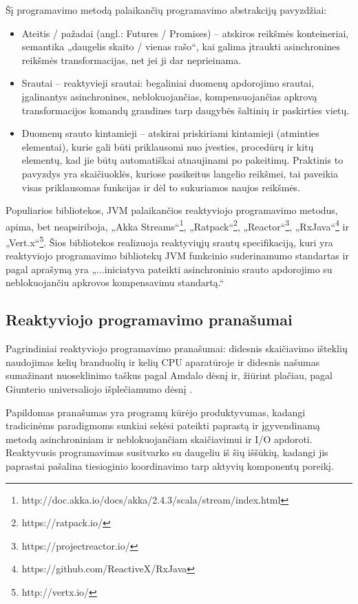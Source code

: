 Šį programavimo metodą palaikančių programavimo abstrakcijų pavyzdžiai:

\begin{itemize}
  \item Ateitis / pažadai (angl.: Futures / Promises) – atskiros reikšmės konteineriai, semantika „daugelis skaito / vienas rašo“, kai galima įtraukti asinchronines reikšmės transformacijas, net jei ji dar neprieinama.
  \item Srautai – reaktyvieji srautai: begaliniai duomenų apdorojimo srautai, įgalinantys asinchronines, neblokuojančias, kompensuojančias apkrovą transformacijos komandų grandines tarp daugybės šaltinių ir paskirties vietų.
  \item Duomenų srauto kintamieji – atskirai priskiriami kintamieji (atminties elementai), kurie gali būti priklausomi nuo įvesties, procedūrų ir kitų elementų, kad jie būtų automatiškai atnaujinami po pakeitimų. Praktinis to pavyzdys yra skaičiuoklės, kuriose pasikeitus langelio reikšmei, tai paveikia visas priklausomas funkcijas ir dėl to sukuriamos naujos reikšmės.
\end{itemize}

Populiarios bibliotekos, JVM palaikančios reaktyviojo programavimo metodus, apima, bet neapsiriboja, „Akka Streams“\footnote{http://doc.akka.io/docs/akka/2.4.3/scala/stream/index.html}, „Ratpack“\footnote{https://ratpack.io/}, „Reactor“\footnote{https://projectreactor.io/}, „RxJava“\footnote{https://github.com/ReactiveX/RxJava} ir „Vert.x“\footnote{http://vertx.io/}. Šios bibliotekos realizuoja reaktyviųjų srautų specifikaciją, kuri yra reaktyviojo programavimo bibliotekų JVM funkcinio suderinamumo standartas ir pagal aprašymą yra „...iniciatyva pateikti asinchroninio srauto apdorojimo su neblokuojančiu apkrovos kompensavimu standartą.“

\subsection{Reaktyviojo programavimo pranašumai}

Pagrindiniai reaktyviojo programavimo pranašumai: didesnis skaičiavimo išteklių naudojimas kelių branduolių ir kelių CPU aparatūroje ir didesnis našumas sumažinant nuoseklinimo taškus pagal Amdalo dėsnį \cite{Rodgers:1985:IMS:327070.327215} ir, žiūrint plačiau, pagal Giunterio universaliojo išplečiamumo dėsnį \cite{opac-b1118020}.

Papildomas pranašumas yra programų kūrėjo produktyvumas, kadangi tradicinėms paradigmoms sunkiai sekėsi pateikti paprastą ir įgyvendinamą metodą asinchroniniam ir neblokuojančiam skaičiavimui ir I/O apdoroti. Reaktyvusis programavimas susitvarko su daugeliu iš šių iššūkių, kadangi jis paprastai pašalina tiesioginio koordinavimo tarp aktyvių komponentų poreikį.

